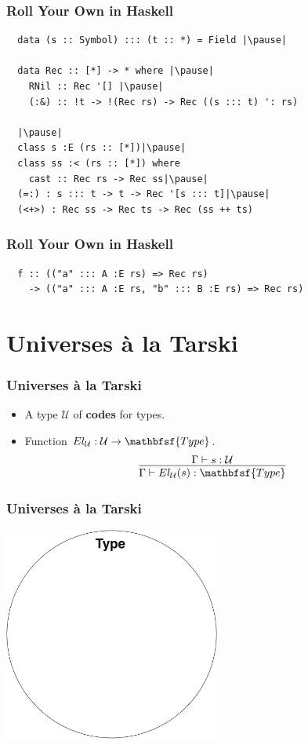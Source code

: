 \documentclass[12pt]{beamer}
\def\Type{\mathbfsf{Type}}
\begin{document}
\begin{frame}[fragile]
  \frametitle{Roll Your Own in Haskell}\pause
  \begin{lstlisting}
  data (s :: Symbol) ::: (t :: *) = Field |\pause|

  data Rec :: [*] -> * where |\pause|
    RNil :: Rec '[] |\pause|
    (:&) :: !t -> !(Rec rs) -> Rec ((s ::: t) ': rs)

  |\pause|
  class s :E (rs :: [*])|\pause|
  class ss :< (rs :: [*]) where
    cast :: Rec rs -> Rec ss|\pause|
  (=:) : s ::: t -> t -> Rec '[s ::: t]|\pause|
  (<+>) : Rec ss -> Rec ts -> Rec (ss ++ ts)
  \end{lstlisting}
\end{frame}

\begin{frame}[fragile]
  \frametitle{Roll Your Own in Haskell}\pause
  \begin{lstlisting}
  f :: (("a" ::: A :E rs) => Rec rs)
    -> (("a" ::: A :E rs, "b" ::: B :E rs) => Rec rs)
  \end{lstlisting}
\end{frame}

\section{Universes \`a la Tarski}

\begin{frame}
  \frametitle{Universes \`a la Tarski}\pause
  \begin{itemize}
    \item A type $\mathcal{U}$ of \textbf{codes} for types.
      \pause
    \item Function $El_\mathcal{U} : \mathcal{U}\to\Type$.
      \pause
      \[
        \infer{
          \Gamma\vdash El_\mathcal{U}(s) : \Type
        }{
          \Gamma\vdash s : \mathcal{U}
        }
      \]
  \end{itemize}
\end{frame}

\begin{frame}
  \frametitle{Universes \`a la Tarski}
  \begin{center}
    \includegraphics[width=2.8in]{universe-empty.pdf}
  \end{center}
\end{frame}
\end{document}
